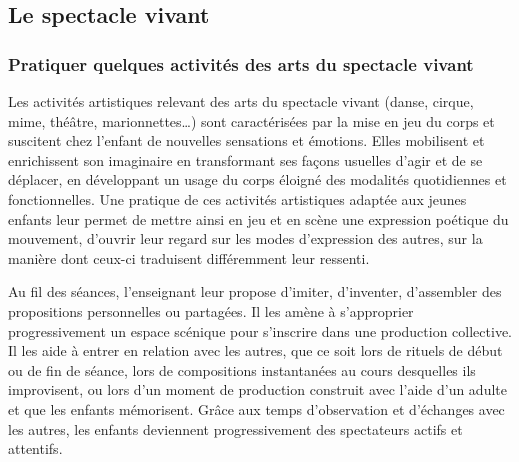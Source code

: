 \subsection{Le spectacle vivant}
\subsubsection{Pratiquer quelques activités des arts du spectacle vivant}
Les activités artistiques relevant des arts du spectacle vivant (danse, cirque, mime, théâtre, marionnettes\dots) sont caractérisées par la mise en jeu du corps et suscitent chez l’enfant de nouvelles sensations et émotions. Elles mobilisent et enrichissent son imaginaire en transformant ses façons usuelles d’agir et de se déplacer, en développant un usage du corps éloigné des modalités quotidiennes et fonctionnelles. Une pratique de ces activités artistiques adaptée aux jeunes enfants leur permet de mettre ainsi en jeu et en scène une expression poétique du mouvement, d’ouvrir leur regard sur les modes d’expression des autres, sur la manière dont ceux-ci traduisent différemment leur ressenti. 

Au fil des séances, l’enseignant leur propose d’imiter, d’inventer, d’assembler des propositions personnelles ou partagées. Il les amène à s’approprier progressivement un espace scénique pour s’inscrire dans une production collective. Il les aide à entrer en relation avec les autres, que ce soit lors de rituels de début ou de fin de séance, lors de compositions instantanées au cours desquelles ils improvisent, ou lors d’un moment de production construit avec l’aide d’un adulte et que les enfants mémorisent. Grâce aux temps d’observation et d’échanges avec les autres, les enfants deviennent progressivement des spectateurs actifs et attentifs. 

